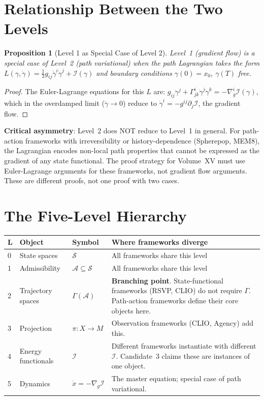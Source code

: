 \documentclass[11pt, a4paper]{book}
\theoremstyle{flyxion}
\newtheorem{proposition}[theorem]{Proposition}
\theoremstyle{remark}
\begin{document}
\section{Relationship Between the Two Levels}

\begin{proposition}[Level 1 as Special Case of Level 2]
Level~1 (gradient flow) is a special case of Level~2 (path
variational) when the path Lagrangian takes the form
$L(\gamma,\dot\gamma) = \frac{1}{2}g_{ij}\dot\gamma^i\dot\gamma^j
+ \mathcal{I}(\gamma)$
and boundary conditions $\gamma(0) = x_0$, $\gamma(T)$ free.
\end{proposition}
\begin{proof}
The Euler-Lagrange equations for this $L$ are:
$g_{ij}\ddot\gamma^j + \Gamma^i_{jk}\dot\gamma^j\dot\gamma^k
= -\nabla^i_g \mathcal{I}(\gamma)$,
which in the overdamped limit ($\ddot\gamma \to 0$) reduce to
$\dot\gamma^i = -g^{ij}\partial_j\mathcal{I}$, the gradient flow.
\end{proof}

\begin{warningbox}
\textbf{Critical asymmetry}: Level~2 does NOT reduce to Level~1 in
general. For path-action frameworks with irreversibility or
history-dependence (Spherepop, MEM\textbar{}8), the Lagrangian
encodes non-local path properties that cannot be expressed as
the gradient of any state functional. The proof strategy for
Volume~XV must use Euler-Lagrange arguments for these frameworks,
not gradient flow arguments. These are different proofs, not one
proof with two cases.
\end{warningbox}

\section{The Five-Level Hierarchy}

\begin{longtable}{p{0.5cm}p{3cm}p{3.5cm}p{5.5cm}}
\toprule
\textbf{L} & \textbf{Object} & \textbf{Symbol} & \textbf{Where frameworks diverge} \\
\midrule
0 & State spaces & $\mathcal{S}$ & All frameworks share this level \\
1 & Admissibility & $\mathcal{A} \subseteq \mathcal{S}$ & All frameworks share this level \\
2 & Trajectory spaces & $\Gamma(\mathcal{A})$ & \textbf{Branching point}. State-functional
  frameworks (RSVP, CLIO) do not require $\Gamma$. Path-action frameworks define their
  core objects here. \\
3 & Projection & $\pi: X \to M$ & Observation frameworks (CLIO, Agency) add this. \\
4 & Energy functionals & $\mathcal{I}$ & Different frameworks instantiate with different
  $\mathcal{I}$. Candidate~3 claims these are instances of one object. \\
5 & Dynamics & $\dot x = -\nabla_g \mathcal{I}$ & The master equation; special case of
  path variational. \\
\bottomrule
\end{longtable}
\end{document}
